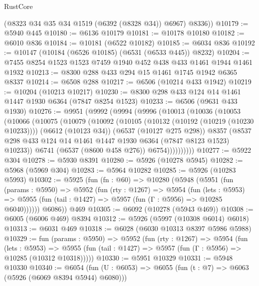 \begin{lexlean}{RustCore}
\begin{coremodule}
        (@8323 @34 @35 @34 @1519 (@6392 (@8328 @34)) @6967)
        @8336))
@10179 := @5940 @445
@10180 := @6136 @10179
@10181 := @10178 @10180
@10182 := @6010 @836
@10184 := @10181 (@6522 @10182)
@10185 := @6034 @836
@10192 := @10147 (@10184 (@6526 @10185) (@6531 (@6533 @445)) @8232)
@10204 := @7455 @8254 @1523 @1523 @7459 @1940 @452 @438 @433 @1461 @1944 @1461 @1932
@10213 := @8300 @288 @433 @294 @15 @1461 @1745 @1942 @6365 @8337
@10214 := @6508 @288
@10217 := @6506 (@10214 @433 @1942)
@10219 := @10204 (@10213 @10217)
@10230 := @8300 @298 @433 @124 @14 @1461 @1447 @1930 @6364 (@7847 @8254 @1523)
@10233 := @6506 (@9631 @433 @1930)
@10276 := @9951
    (@9992
      (@9994
        (@9996
          (@10013
            (@10036
              (@10053
                (@10066
                  (@10075
                    (@10079
                      (@10092
                        (@10105
                          (@10132 (@10192 (@10219 (@10230 @10233))))
                          (@6612 (@10123 @34))
                          (@6537 (@10127 @275 @298))
                          @8357
                          (@8537
                            @298
                            @433
                            @124
                            @14
                            @1461
                            @1447
                            @1930
                            @6364
                            (@7847 @8123 @1523)
                            @10233))
                        @6741
                        (@6537 (@8600 @458 @276))
                        @6754))))))))))
@10277 := @5922 @304
@10278 := @5930 @8391
@10280 := @5926 (@10278 @5945)
@10282 := @5968 (@5969 @304)
@10283 := @5964 @10282
@10285 := @5926 (@10283 @5993)
@10302 := @5925
    (fun (fn : @60) =>
    @10280
      (@5948
        (@5951
          (fun (params : @5950) =>
          @5952
            (fun (rty : @1267) =>
            @5954
              (fun (lets : @5953) =>
              @5955 (fun (tail : @1427) => @5957 (fun (Γ : @5956) => @10285 @6040))))))
        @6086))
    @469
@10305 := @6092 (@10278 (@5943 @469))
@10308 := @6005 (@6006 @469) @8394
@10312 := @5926 (@5997 (@10308 @6014) @6018)
@10313 := @6031 @469
@10318 := @6028 (@6030 @10313 @8397 @5986 @5988)
@10329 := fun (params : @5950) =>
  @5952
    (fun (rty : @1267) =>
    @5954
      (fun (lets : @5953) =>
      @5955 (fun (tail : @1427) => @5957 (fun (Γ : @5956) => @10285 (@10312 @10318)))))
@10330 := @5951 @10329
@10331 := @5948 @10330
@10340 := @6054 (fun (U : @6053) => @6055 (fun (t : @7) => @6063 (@5926 (@6069 @8394 @5944) @6080)))

\end{coremodule}
\end{lexlean}
